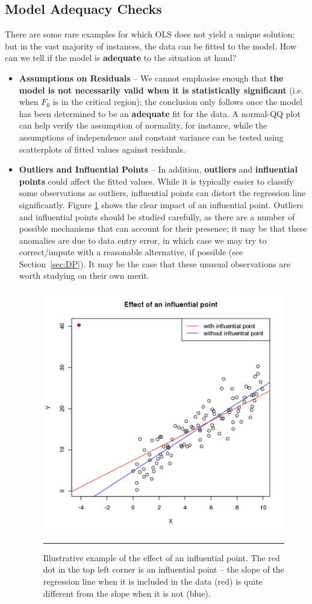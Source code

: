 \subsection{Model Adequacy Checks} There are some rare examples for which OLS does not yield a unique solution; but in the vast majority of instances, the data can be fitted to the model. How can we tell if the model is \textbf{adequate} to the situation at hand? 
\begin{itemize}
\item \textbf{Assumptions on Residuals} -- We cannot emphasise enough that \textbf{the model is not necessarily valid when it is statistically significant} (i.e. when $F_0$ is in the critical region); the conclusion only follows once the model has been determined to be an \textbf{adequate} fit for the data. A normal-QQ plot can help verify the assumption of normality, for instance, while the assumptions of independence and constant variance can be tested using scatterplots of fitted values against residuals.

\item \textbf{Outliers and Influential Points} -- In addition, \textbf{outliers} and \textbf{influential points} could affect the fitted values. While it is typically easier to classify some observations as outliers, influential points can distort the regression line significantly. Figure \ref{fig:testA5} shows the clear impact of an influential point. Outliers and influential points should be studied carefully, as there are a number of possible mechanisms that can account for their presence; it may be that these anomalies are due to data entry error, in which case we may try to correct/impute with a reasonable alternative, if possible (see Section~\ref{sec:DP}). It may be the case that these unusual observations are worth studying on their own merit.

\begin{figure}[!t]
\centering
  \includegraphics[width=0.5\linewidth]{Images/testA5.png}
  \caption[\small Illustrative example of the effect of an influential point]{\small Illustrative example of the effect of an influential point. The red dot in the top left corner is an influential point -- the slope of the  regression line when it is included in the data (red) is quite different from the slope when it is not (blue).}
  \label{fig:testA5}\hrule
\end{figure}


\end{itemize}
